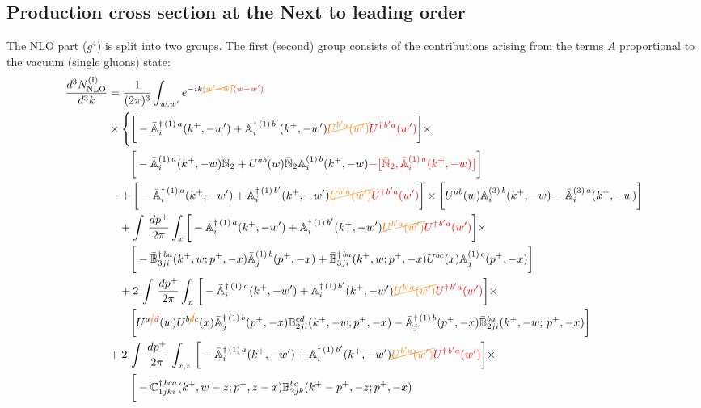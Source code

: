 \documentclass[aps,prd,amsmath,amssymb,nofootinbib]{revtex4-2}
\def\mf#1{\mathbb{#1}}
\numberwithin{equation}{section}
\begin{document}
\subsection{Production cross section at the Next to leading order}
The NLO part ($g^4$) is split into two groups. The first (second) group consists
of the contributions arising from the terms $A$ proportional to the vacuum (single gluons) state: 
\begin{align} \label{eq:CS1}
    \frac{d^{3}N_{\rm NLO}^{\rm (I)}}{d^{3}k} & =
    \frac{1}{(2\pi)^{3}}  \int_{w, w^\prime} e^{-ik{\color{orange}\cancel{(w^\prime-w)}}{\color{red}(w-w^\prime)}}
    \notag \\ & \times \Bigg\{\bigg[-\bar{\mf{A}}^{\dagger\,(1)\,a}_{i}(k^{+},-w^{\prime})+\mf{A}^{\dagger\, (1)\, b^{\prime}}_{i}(k^{+},-w^{\prime}){\color{orange}\cancel{U^{b^{\prime}a}(w^{\prime})}}{\color{red}U^{\dagger\, b^{\prime}a}(w^{\prime})}\bigg]\times\notag \\ & \quad\quad\bigg[-\bar{\mf{A}}^{(1)\,a}_{i}(k^{+},-w)\mf{N}_{2}+ U^{ab}(w)\bar{\mf{N}}_{2}\mf{A}^{(1)\, b}_{i}(k^{+},-w){\color{red}-\big[\bar{\mf{N}}_{2},\bar{\mf{A}}^{(1)\,a}_{i}(k^{+},-w)\big]}\bigg]\notag \\ & \quad +\bigg[-\bar{\mf{A}}^{\dagger\,(1)\,a}_{i}(k^{+},-w^{\prime})+\mf{A}^{\dagger\, (1)\, b^{\prime}}_{i}(k^{+},-w^{\prime}){\color{orange}\cancel{U^{b^{\prime}a}(w^{\prime})}}{\color{red}U^{\dagger\, b^{\prime}a}(w^{\prime})}\bigg]\times\bigg[U^{ab}(w)\mf{A}^{(3)\, b}_{i}(k^{+},- w)-\Bar{\mf{A}}^{(3)\, a}_{i}(k^{+}, - w)\bigg]\notag \\ & \quad +\int\,\frac{dp^{+}}{2\pi} \int_{x} \bigg[-\bar{\mf{A}}^{\dagger\,(1)\,a}_{i}(k^{+},-w^{\prime})+\mf{A}^{\dagger\, (1)\, b^{\prime}}_{i}(k^{+},-w^{\prime}){\color{orange}\cancel{U^{b^{\prime}a}(w^{\prime})}}{\color{red}U^{\dagger\, b^{\prime}a}(w^{\prime})}\bigg]\times\notag \\ & \quad \quad \bigg[-\Bar{\mf{B}}^{\dagger\, ba}_{3ji}(k^{+}, w; p^{+}, -x)\Bar{\mf{A}}^{(1)\,b}_{j}(p^{+}, - x)
         + \Bar{\mf{B}}^{\dagger\, ba}_{3ji}(k^{+},w; p^{+},-x) U^{bc}(x) \mf{A}^{(1)\, c}_{j}(p^{+},- x)\bigg]\notag \\ & \quad  +2\, \int\,\frac{dp^{+}}{2\pi} \int_{x}\,\bigg[-\bar{\mf{A}}^{\dagger\,(1)\,a}_{i}(k^{+},-w^{\prime})+\mf{A}^{\dagger\, (1)\, b^{\prime}}_{i}(k^{+},-w^{\prime}){\color{orange}\cancel{U^{b^{\prime}a}(w^{\prime})}}{\color{red}U^{\dagger\, b^{\prime}a}(w^{\prime})}\bigg]\times \notag \\ & \quad \quad \bigg[U^{a{\color{orange}\cancel{c}}{\color{red}d}}(w)U^{b{\color{orange}\cancel{d}}{\color{red}c}}(x) \bar{\mf{A}}^{\dagger\, (1)\, b}_{j}(p^+,- x) {\mf{B}}^{cd}_{2ji} (k^+, -w;p^+, -x) - \Bar{\mf{A}}^{\dagger\, (1)\, b}_{j}(p^{+}, -x)\Bar{\mf{B}}^{ba}_{2ji}(k^{+},-w;\,p^{+}, -x) \bigg] \notag \\ &+  2\, \int\, \frac{dp^{+}}{2\pi}\,\int_{x,z}\, \bigg[-\bar{\mf{A}}^{\dagger\,(1)\,a}_{i}(k^{+},-w^{\prime})+\mf{A}^{\dagger\, (1)\, b^{\prime}}_{i}(k^{+},-w^{\prime}){\color{orange}\cancel{U^{b^{\prime}a}(w^{\prime})}}{\color{red}U^{\dagger\, b^{\prime}a}(w^{\prime})}\bigg]\times\notag \\ & \quad \quad \bigg[-\Bar{\mf{C}}^{\dagger\, bca}_{1jki}(k^{+},w-z;p^{+},z-x)\Bar{\mf{B}}^{bc}_{2jk}(k^{+}-p^{+},- z;p^{+},-x)

\end{align}
\end{document}
